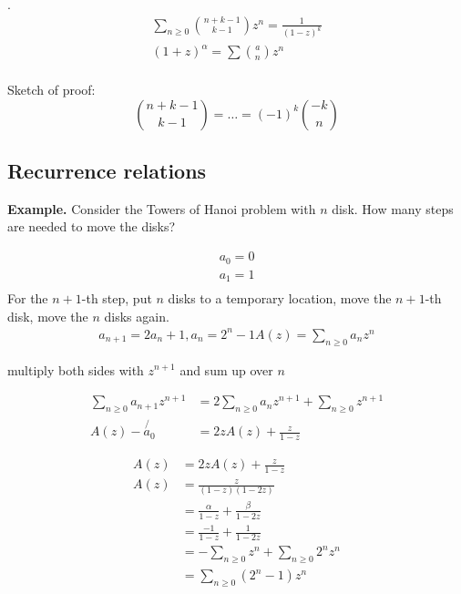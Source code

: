 \Lemma.
\begin{gather*}
    \sum_{n≥0} {\binom{n+k-1}{k-1}} z^n
    = \frac1{(1-z)^k} \\
    (1 + z)^\alpha = \sum {\binom{a}{n}} z^n \\
\end{gather*}

Sketch of proof:
\[
    {\binom{n+k-1} {k-1}} = \ldots = (-1)^k{\binom{-k}{n}}
\]


\subsection{Recurrence relations}

\textbf{Example.}
Consider the Towers of Hanoi problem with $n$ disk. How many steps are needed to move the disks?

\begin{align*}
  a_0 = 0 \\
  a_1 = 1 \\
\end{align*}
For the $n+1$-th step, put $n$ disks to a temporary location, move the $n+1$-th disk, move the $n$ disks again.
\begin{align*}
  a_{n+1} = 2 a_n + 1, a_n = 2^n - 1
  A(z) = \sum_{n \geq 0} a_n z^n
\end{align*}

multiply both sides with $z^{n+1}$ and sum up over $n$

\begin{align*}
\sum_{n≥0} a_{n+1} z^{n+1} &= 2 \sum_{n \geq 0} a_n z^{n+1} + \sum_{n\geq 0} z^{n+1} \\
A(z) - \not{a_0}    &= 2z A(z) + \frac{z}{1-z}
\end{align*}

\begin{align*}
A(z) &= 2 z A(z) + \frac{z}{1-z}\\
A(z) &= \frac{z}{(1-z)(1-2z)} \\
    &= \frac{\alpha}{1-z} + \frac{\beta} {1-2z}\\
    &= \frac{-1}{1-z} + \frac{1}{1-2z} \\
    &= -\sum_{n\geq 0} z^n + \sum_{n\geq 0} 2^n z^n\\
    &= \sum_{n\geq 0} (2^n-1) z^n\\
\end{align*}

